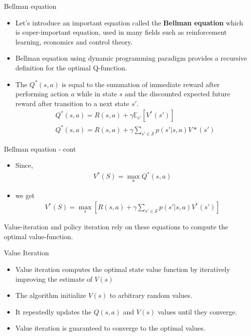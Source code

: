 \documentclass[10pt,mathserif]{beamer}
\begin{document}
\begin{frame}{Bellman equation}
\begin{itemize}
\item Let's introduce an important equation called the \textbf{Bellman equation} which is super-important equation, used in many fields such as reinforcement learning, economics and control theory.
\item Bellman equation using dynamic programming paradigm provides a recursive definition for the optimal Q-function.
\item The $Q^*(s,a)$ is equal to the summation of immediate reward after performing action $a$ while in state $s$ and the discounted expected future reward after transition to a next state $s'$.
\begin{align}
&Q^*(s,a) = R(s,a) + \gamma\mathbb{E}_{s'}\left[V^*(s')\right] \\
&Q^*(s,a) = R(s,a) + \gamma\sum_{s'\in\mathcal{S}}p(s'|s,a)V*(s')
\end{align}
\end{itemize}
\end{frame}

\begin{frame}{Bellman equation - cont}
\begin{itemize}
\item Since,
\begin{align}
V^*(S) = \max_a Q^*(s,a)
\end{align}
\item we get
\begin{align}
V^*(S) = \max_s\left[R(s,a) + \gamma \sum_{s'\in \mathcal{S}} p(s'|s,a) V^*(s')\right]
\end{align}
\end{itemize}
Value-iteration and policy iteration rely on these equations to compute the optimal value-function.
\end{frame}

\begin{frame}{Value Iteration}
\begin{itemize}
\item Value iteration computes the optimal state value function by iteratively improving the estimate of $V(s)$
\item The algorithm initialize $V(s)$ to arbitrary random values.
\item It repeatedly updates the $Q(s,a)$ and $V(s)$ values until they converge.
\item Value iteration is guaranteed to converge to the optimal values.
\end{itemize}
\end{frame}
\end{document}
